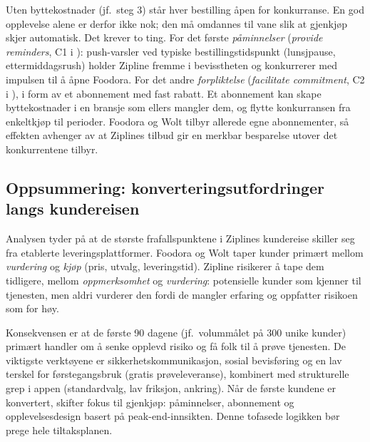 \documentclass[12pt, a4paper]{article}
\begin{document}
Uten byttekostnader (jf.\ steg 3) står hver bestilling åpen for
konkurranse. En god opplevelse alene er derfor ikke nok; den må omdannes
til vane slik at gjenkjøp skjer automatisk. Det krever to ting. For det første
\textit{påminnelser} (\textit{provide reminders}, C1 i
\cite{muenscher2016}): push-varsler ved typiske bestillingstidspunkt
(lunsjpause, ettermiddagsrush) holder Zipline fremme i bevisstheten og
konkurrerer med impulsen til å åpne Foodora. For det andre
\textit{forpliktelse} (\textit{facilitate commitment}, C2 i
\cite{muenscher2016}), i form av et abonnement med fast rabatt.
Et abonnement kan skape byttekostnader
\parencite[jf.\ kraft 3 i][]{porter1980} i en bransje som ellers mangler
dem, og flytte konkurransen fra enkeltkjøp til perioder. Foodora og Wolt
tilbyr allerede egne abonnementer, så effekten avhenger av at Ziplines
tilbud gir en merkbar besparelse utover det konkurrentene tilbyr.

\subsection{Oppsummering: konverteringsutfordringer langs kundereisen}

Analysen tyder på at de største frafallspunktene i Ziplines kundereise
skiller seg fra etablerte leveringsplattformer. Foodora og Wolt taper
kunder primært mellom \textit{vurdering} og \textit{kjøp} (pris, utvalg,
leveringstid). Zipline risikerer å tape dem tidligere, mellom
\textit{oppmerksomhet} og \textit{vurdering}: potensielle kunder som
kjenner til tjenesten, men aldri vurderer den fordi de mangler erfaring og
oppfatter risikoen som for høy.

Konsekvensen er at de første 90 dagene (jf.\ volummålet på 300 unike
kunder) primært handler om å senke opplevd risiko og få folk til å prøve
tjenesten. De viktigste verktøyene er sikkerhetskommunikasjon, sosial
bevisføring og en lav terskel for førstegangsbruk (gratis prøveleveranse),
kombinert med strukturelle grep i appen (standardvalg, lav friksjon,
ankring). Når de første kundene er konvertert, skifter fokus til gjenkjøp:
påminnelser, abonnement og opplevelsesdesign basert på peak-end-innsikten.
Denne tofasede logikken bør prege hele tiltaksplanen.

\printbibliography[title={Referanseliste}]
\end{document}
